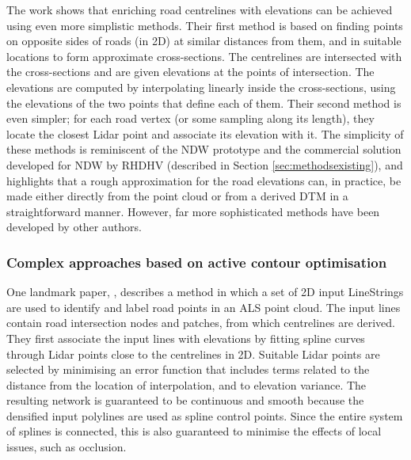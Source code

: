The work \cite{cai_rasdorf_2008} shows that enriching road centrelines with elevations can be achieved using even more simplistic methods. Their first method is based on finding points on opposite sides of roads (in 2D) at similar distances from them, and in suitable locations to form approximate cross-sections. The centrelines are intersected with the cross-sections and are given elevations at the points of intersection. The elevations are computed by interpolating linearly inside the cross-sections, using the elevations of the two points that define each of them. Their second method is even simpler; for each road vertex  (or some sampling along its length), they locate the closest Lidar point and associate its elevation with it. The simplicity of these methods is reminiscent of the NDW prototype and the commercial solution developed for NDW by RHDHV (described in Section \ref{sec:methodsexisting}), and highlights that a rough approximation for the road elevations can, in practice, be made either directly from the point cloud or from a derived DTM in a straightforward manner. However, far more sophisticated methods have been developed by other authors.

\subsubsection{Complex approaches based on active contour optimisation}

One landmark paper, \cite{boyko_funkhauser_2011}, describes a method in which a set of 2D input LineStrings are used to identify and label road points in an ALS point cloud. The input lines contain road intersection nodes and patches, from which centrelines are derived. They first associate the input lines with elevations by fitting spline curves through Lidar points close to the centrelines in 2D. Suitable Lidar points are selected by minimising an error function that includes terms related to the distance from the location of interpolation, and to elevation variance. The resulting network is guaranteed to be continuous and smooth because the densified input polylines are used as spline control points. Since the entire system of splines is connected, this is also guaranteed to minimise the effects of local issues, such as occlusion.

